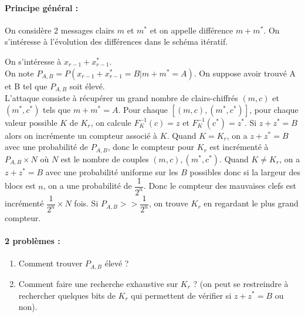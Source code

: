 \documentclass[12pt,a4paper]{report}
\begin{document}
\paragraph{Principe général :\\}
On considère 2 messages clairs $m$ et $m^*$ et on appelle différence $m+m^*$. On s'intéresse à l'évolution des différences dans le schéma itératif.
\begin{center}
  \scalebox{0.6}{}	
\end{center}

On s'intéresse à $x_{r-1} + x^*_{r-1} $. \\
On note $P_{A,B} = P(x_{r-1}+x^*_{r-1} = B | m + m^* = A)$. On suppose avoir trouvé A et B tel que $P_{A,B}$ soit élevé.\\
L'attaque consiste à récupérer un grand nombre de clairs-chiffrés $(m,c)$ et $(m^*,c^*)$ tels que $m+m^*=A$. Pour chaque $[(m,c),(m^*,c^*)]$, pour chaque valeur possible $K$ de $K_r$, on calcule $F_K^{-1}(c)=z$ et $F_K^{-1}(c^*)=z^*$. Si $z+z^* = B$ alors on incrémente un compteur associé à $K$. Quand $K=K_r$, on a $z+z^*=B$ avec une probabilité de $P_{A,B}$, donc le compteur pour $K_r$ est incrémenté à $P_{A,B}\times N$ où $N$ est le nombre de couples $(m,c),(m^*,c^*)$. Quand $K\neq K_r$, on a $z+z^*=B$ avec une probabilité uniforme sur les $B$ possibles donc si la largeur des blocs est $n$, on a une probabilité de $\dfrac{1}{2^n}$. Donc le compteur des mauvaises clefs est incrémenté $\dfrac{1}{2^n}\times N$ fois. Si $P_{A,B} >> \dfrac{1}{2^n}$, on trouve $K_r$ en regardant le plus grand compteur.
\paragraph{2 problèmes :}
\begin{enumerate}
\item Comment trouver $P_{A,B}$ élevé ?
\item Comment faire une recherche exhaustive sur $K_r$ ? (on peut se restreindre à rechercher quelques bits de $K_r$ qui permettent de vérifier si $z+z^*=B$ ou non).
\end{enumerate}
\end{document}
